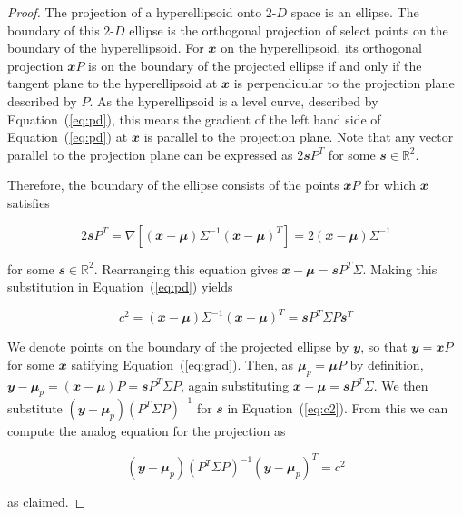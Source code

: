 \documentclass[
  12pt,
]{interact}
\newcommand\gD{$2\text{-}D$}
\begin{document}
\begin{proof}
The projection of a hyperellipsoid onto \gD{} space is an ellipse. The boundary of this \gD{} ellipse is the orthogonal projection of select points on the boundary of the hyperellipsoid. For $\mathbfit{x}$ on the hyperellipsoid, its orthogonal projection $\mathbfit{x}P$ is on the boundary of the projected ellipse if and only if the tangent plane to the hyperellipsoid at $\mathbfit{x}$ is perpendicular to the projection plane described by $P$. As the hyperellipsoid is a level curve, described by Equation~(\ref{eq:pd}), this means the gradient of the left hand side of Equation~(\ref{eq:pd}) at $\mathbfit{x}$ is parallel to the projection plane. Note that any vector parallel to the projection plane can be expressed as $2\mathbfit{s}P^T$ for some $\mathbfit{s} \in \mathbb{R}^2$.

Therefore, the boundary of the ellipse consists of the points $\mathbfit{x}P$ for which $\mathbfit{x}$ satisfies

\begin{equation}
2\mathbfit{s}P^T = \nabla \left[(\mathbfit{x}-\mathbfit{\mu}) \Sigma^{-1}(\mathbfit{x}-\mathbfit{\mu})^T\right] = 2 (\mathbfit{x}-\mathbfit{\mu}) \Sigma^{-1}
\label{eq:grad}
\end{equation}

for some $\mathbfit{s} \in \mathbb{R}^2$. Rearranging this equation gives $\mathbfit{x}-\mathbfit{\mu} = \mathbfit{s} P^T \Sigma$.
Making this substitution in Equation~(\ref{eq:pd}) yields

\begin{equation}
c^2 = (\mathbfit{x}-\mathbfit{\mu}) \Sigma^{-1}(\mathbfit{x}-\mathbfit{\mu})^T = \mathbfit{s} P^T \Sigma P \mathbfit{s}^T
\label{eq:c2}
\end{equation}

We denote points on the boundary of the projected ellipse by $\mathbfit{y}$, so that $\mathbfit{y} = \mathbfit{x}P$ for some $\mathbfit{x}$ satifying Equation~(\ref{eq:grad}). Then, as $\mathbfit{\mu}_p = \mathbfit{\mu} P$ by definition, $\mathbfit{y} - \mathbfit{\mu}_p = (\mathbfit{x} - \mathbfit{\mu})P = \mathbfit{s} P^T \Sigma P$, again substituting $\mathbfit{x}-\mathbfit{\mu} = \mathbfit{s} P^T \Sigma$. We then substitute $(\mathbfit{y} - \mathbfit{\mu}_p) (P^T \Sigma P)^{-1}$ for $\mathbfit{s}$ in Equation~(\ref{eq:c2}). From this we can compute the analog equation for the projection as

\begin{equation}
(\mathbfit{y} - \mathbfit{\mu}_p)(P^T \Sigma P)^{-1}(\mathbfit{y} - \mathbfit{\mu}_p)^T = c^2
\end{equation}

as claimed.
\end{proof}
\end{document}
